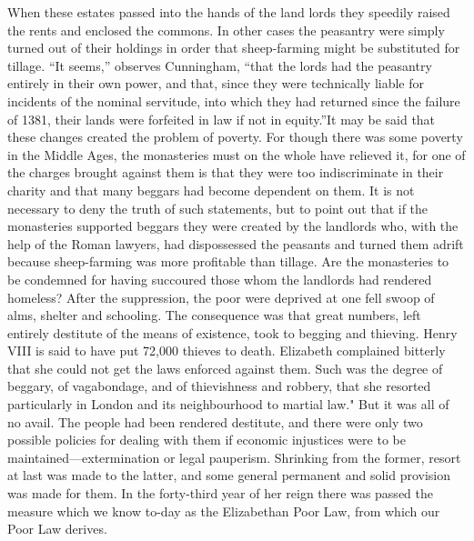 \documentclass{book}
\begin{document}
When these estates passed into the hands of the land lords they speedily raised the rents and enclosed the commons. In other cases the peasantry were simply turned out of their holdings in order that sheep-farming might be substituted for tillage. “It seems,” observes Cunningham, “that the lords had the peasantry entirely in their own power, and that, since they were technically liable for incidents of the nominal servitude, into which they had returned since the failure of 1381, their lands were forfeited in law if not in equity.”\footnotemark[8] It may be said that these changes created the problem of poverty. For though there was some poverty in the Middle Ages, the monasteries must on the whole have relieved it, for one of the charges brought against them is that they were too indiscriminate in their charity and that many beggars had become dependent on them. It is not necessary to deny the truth of such statements, but to point out that if the monasteries supported beggars they were created by the landlords who, with the help of the Roman lawyers, had dispossessed the peasants and turned them adrift because sheep-farming was more profitable than tillage. Are the monasteries to be condemned for having succoured those whom the landlords had rendered homeless? After the suppression, the poor were deprived at one fell swoop of alms, shelter and schooling. The consequence was that great numbers, left entirely destitute of the means of existence, took to begging and thieving. Henry VIII is said to have put 72,000 thieves to death. Elizabeth complained bitterly that she could not get the laws enforced against them. Such was the degree of beggary, of vagabondage, and of thievishness and robbery, that she resorted particularly in London and its neighbourhood to martial law." But it was all of no avail. The people had been rendered destitute, and there were only two possible policies for dealing with them if economic injustices were to be maintained—extermination or legal pauperism. Shrinking from the former, resort at last was made to the latter, and some general permanent and solid provision was made for them. In the forty-third year of her reign there was passed the measure which we know to-day as the Elizabethan Poor Law, from which our Poor Law derives.
\end{document}
